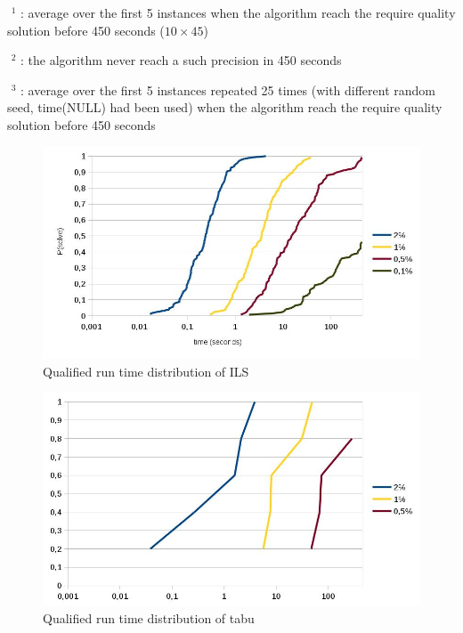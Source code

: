 \documentclass[12pt,a4paper]{article}
\begin{document}
$\text{~}^1$ : average over the first 5 instances when the algorithm reach the require quality solution before 450 seconds ($10 \times 45$)

$\text{~}^2$ : the algorithm never reach a such precision in 450 seconds

$\text{~}^3$ : average over the first 5 instances repeated 25 times (with different random seed, time(NULL) had been used) when the algorithm reach the require quality solution before 450 seconds

\begin{figure}[!h]
\centering
\includegraphics[scale=0.35]{Qualified_run_time_distribution.jpg}
\caption{Qualified run time distribution of ILS}
\label{Qualified run time distribution of ILS}
\end{figure}

\begin{figure}[!h]
\centering
\includegraphics[scale=0.35]{Qualified_run_time_distribution2.jpg}
\caption{Qualified run time distribution of tabu}
\label{Qualified run time distribution of tabu}
\end{figure}
\end{document}
